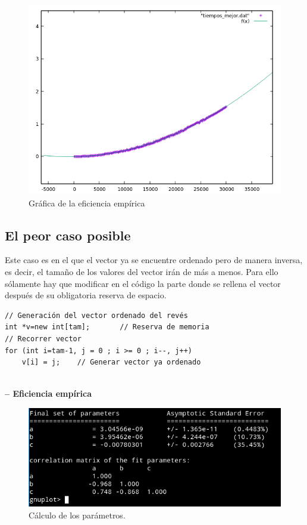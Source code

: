 \begin{figure}[H] %
\centering
\includegraphics[scale=0.5]{ejercicio4/regresionMejor.png}  
\caption{Gráfica de la eficiencia empírica} 
\label{fig:figura4-2}
\end{figure}

\subsection{El peor caso posible}
	
		Este caso es en el que el vector ya se encuentre ordenado pero de manera inversa, es decir, el tamaño de los valores del vector irán de más a menos. Para ello sólamente hay que modificar en el código la parte donde se rellena el vector después de su obligatoria reserva de espacio.
\begin {lstlisting}
// Generación del vector ordenado del revés
int *v=new int[tam];       // Reserva de memoria
// Recorrer vector
for (int i=tam-1, j = 0 ; i >= 0 ; i--, j++)  
	v[i] = j;    // Generar vector ya ordenado
	
\end{lstlisting}

\textbf{-- Eficiencia empírica}
\begin{figure}[H] %
\centering
\includegraphics[scale=0.5]{ejercicio4/plotPeor.png}  
\caption{Cálculo de los parámetros.} 
\label{fig:figura4-3}
\end{figure}

